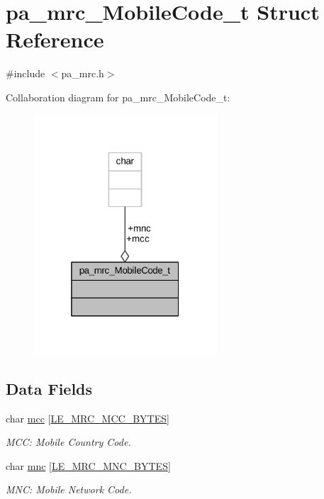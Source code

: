 \hypertarget{structpa__mrc___mobile_code__t}{}\section{pa\+\_\+mrc\+\_\+\+Mobile\+Code\+\_\+t Struct Reference}
\label{structpa__mrc___mobile_code__t}


{\ttfamily \#include $<$pa\+\_\+mrc.\+h$>$}



Collaboration diagram for pa\+\_\+mrc\+\_\+\+Mobile\+Code\+\_\+t\+:
\nopagebreak
\begin{figure}[H]
\begin{center}
\leavevmode
\includegraphics[width=193pt]{structpa__mrc___mobile_code__t__coll__graph}
\end{center}
\end{figure}
\subsection*{Data Fields}
\begin{DoxyCompactItemize}
\item 
char \hyperlink{structpa__mrc___mobile_code__t_a3e12dee137209897eaad7bae61499c32}{mcc} \mbox{[}\hyperlink{le__mrc__interface_8h_aec88b97b54a45f86e6cb34f65b2d0afd}{L\+E\+\_\+\+M\+R\+C\+\_\+\+M\+C\+C\+\_\+\+B\+Y\+T\+ES}\mbox{]}
\begin{DoxyCompactList}\small\item\em M\+CC\+: Mobile Country Code. \end{DoxyCompactList}\item 
char \hyperlink{structpa__mrc___mobile_code__t_afa5ce7bc019d46d626ddfa545ac1f316}{mnc} \mbox{[}\hyperlink{le__mrc__interface_8h_aeae0e240c77730be724ad7ac42596469}{L\+E\+\_\+\+M\+R\+C\+\_\+\+M\+N\+C\+\_\+\+B\+Y\+T\+ES}\mbox{]}
\begin{DoxyCompactList}\small\item\em M\+NC\+: Mobile Network Code. \end{DoxyCompactList}\end{DoxyCompactItemize}


